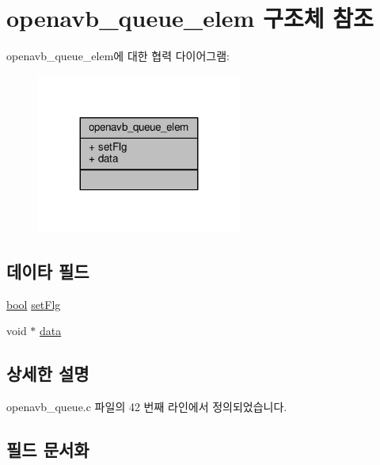 \hypertarget{structopenavb__queue__elem}{}\section{openavb\+\_\+queue\+\_\+elem 구조체 참조}
\label{structopenavb__queue__elem}


openavb\+\_\+queue\+\_\+elem에 대한 협력 다이어그램\+:
\nopagebreak
\begin{figure}[H]
\begin{center}
\leavevmode
\includegraphics[width=191pt]{structopenavb__queue__elem__coll__graph}
\end{center}
\end{figure}
\subsection*{데이타 필드}
\begin{DoxyCompactItemize}
\item 
\hyperlink{avb__gptp_8h_af6a258d8f3ee5206d682d799316314b1}{bool} \hyperlink{structopenavb__queue__elem_ae6c344e5ef7cdc07d497b7ed071968a8}{set\+Flg}
\item 
void $\ast$ \hyperlink{structopenavb__queue__elem_a735984d41155bc1032e09bece8f8d66d}{data}
\end{DoxyCompactItemize}


\subsection{상세한 설명}


openavb\+\_\+queue.\+c 파일의 42 번째 라인에서 정의되었습니다.



\subsection{필드 문서화}
